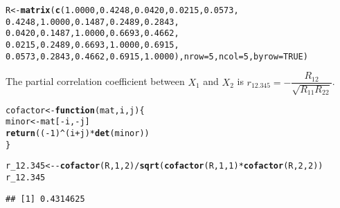\documentclass[11pt, a4paper]{article}\usepackage[]{graphicx}\usepackage[]{xcolor}
\makeatletter
\newcommand{\hlnum}[1]{\textcolor[rgb]{0.686,0.059,0.569}{#1}}%
\newcommand{\hlopt}[1]{\textcolor[rgb]{0,0,0}{#1}}%
\newcommand{\hldef}[1]{\textcolor[rgb]{0.345,0.345,0.345}{#1}}%
\newcommand{\hlkwa}[1]{\textcolor[rgb]{0.161,0.373,0.58}{\textbf{#1}}}%
\newcommand{\hlkwb}[1]{\textcolor[rgb]{0.69,0.353,0.396}{#1}}%
\newcommand{\hlkwc}[1]{\textcolor[rgb]{0.333,0.667,0.333}{#1}}%
\newcommand{\hlkwd}[1]{\textcolor[rgb]{0.737,0.353,0.396}{\textbf{#1}}}%
\newenvironment{kframe}{%
 \def\at@end@of@kframe{}%
 \ifinner\ifhmode%
  \def\at@end@of@kframe{\end{minipage}}%
  \begin{minipage}{\columnwidth}%
 \fi\fi%
 \def\FrameCommand##1{\hskip\@totalleftmargin \hskip-\fboxsep
 \colorbox{shadecolor}{##1}\hskip-\fboxsep
     \hskip-\linewidth \hskip-\@totalleftmargin \hskip\columnwidth}%
 \MakeFramed {\advance\hsize-\width
   \@totalleftmargin\z@ \linewidth\hsize
   \@setminipage}}%
 {\par\unskip\endMakeFramed%
 \at@end@of@kframe}
\newenvironment{knitrout}{}{} %
\makeatother
\begin{document}
\begin{knitrout}
\color{fgcolor}\begin{kframe}
\begin{alltt}
\hldef{R} \hlkwb{<-} \hlkwd{matrix}\hldef{(}\hlkwd{c}\hldef{(}\hlnum{1.0000}\hldef{,} \hlnum{0.4248}\hldef{,} \hlnum{0.0420}\hldef{,} \hlnum{0.0215}\hldef{,} \hlnum{0.0573}\hldef{,}
              \hlnum{0.4248}\hldef{,} \hlnum{1.0000}\hldef{,} \hlnum{0.1487}\hldef{,} \hlnum{0.2489}\hldef{,} \hlnum{0.2843}\hldef{,}
              \hlnum{0.0420}\hldef{,} \hlnum{0.1487}\hldef{,} \hlnum{1.0000}\hldef{,} \hlnum{0.6693}\hldef{,} \hlnum{0.4662}\hldef{,}
              \hlnum{0.0215}\hldef{,} \hlnum{0.2489}\hldef{,} \hlnum{0.6693}\hldef{,} \hlnum{1.0000}\hldef{,} \hlnum{0.6915}\hldef{,}
              \hlnum{0.0573}\hldef{,} \hlnum{0.2843}\hldef{,} \hlnum{0.4662}\hldef{,} \hlnum{0.6915}\hldef{,} \hlnum{1.0000}\hldef{),} \hlkwc{nrow} \hldef{=} \hlnum{5}\hldef{,} \hlkwc{ncol} \hldef{=} \hlnum{5}\hldef{,} \hlkwc{byrow} \hldef{=} \hlnum{TRUE}\hldef{)}
\end{alltt}
\end{kframe}
\end{knitrout}

 \hspace{0.1cm} The partial correlation coefficient between $X_1$ and $X_2$ is $r_{12.345} = - \dfrac{R_{12}}{\sqrt{R_{11} R_{22}}}$.

\begin{knitrout}
\color{fgcolor}\begin{kframe}
\begin{alltt}
\hldef{cofactor} \hlkwb{<-} \hlkwa{function}\hldef{(}\hlkwc{mat}\hldef{,} \hlkwc{i}\hldef{,} \hlkwc{j}\hldef{) \{}
  \hldef{minor} \hlkwb{<-} \hldef{mat[}\hlopt{-}\hldef{i,} \hlopt{-}\hldef{j]}
  \hlkwd{return} \hldef{((}\hlopt{-}\hlnum{1}\hldef{)}\hlopt{^}\hldef{(i} \hlopt{+} \hldef{j)} \hlopt{*} \hlkwd{det}\hldef{(minor))}
\hldef{\}}
\end{alltt}
\end{kframe}
\end{knitrout}

\begin{knitrout}
\color{fgcolor}\begin{kframe}
\begin{alltt}
\hldef{r_12.345} \hlkwb{<-} \hlopt{-} \hlkwd{cofactor}\hldef{(R,} \hlnum{1}\hldef{,} \hlnum{2}\hldef{)} \hlopt{/} \hlkwd{sqrt}\hldef{(}\hlkwd{cofactor}\hldef{(R,} \hlnum{1}\hldef{,} \hlnum{1}\hldef{)} \hlopt{*} \hlkwd{cofactor}\hldef{(R,} \hlnum{2}\hldef{,} \hlnum{2}\hldef{))}
\hldef{r_12.345}
\end{alltt}
\begin{verbatim}
## [1] 0.4314625
\end{verbatim}
\end{kframe}
\end{knitrout}
\end{document}
